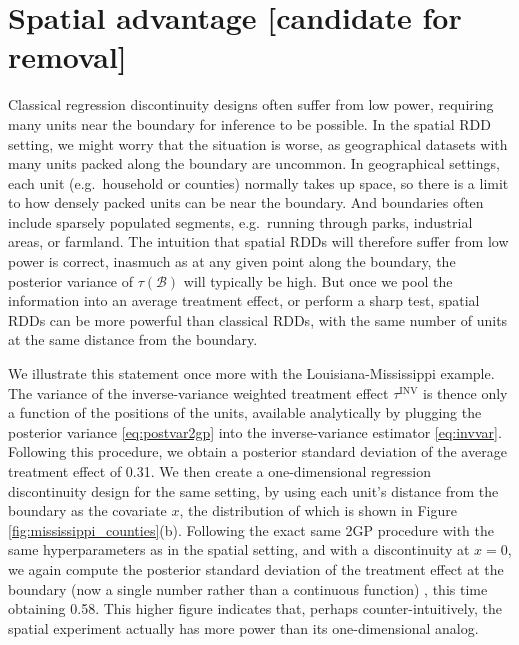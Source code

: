 \documentclass[letter]{article}
\newcommand{\boundary}{\mathcal{B}}
\newcommand{\invvar}{\tau^{\mathrm{INV}}}
\begin{document}
    	\section{Spatial advantage {[}candidate for removal{]}}\label{spatial-advantage-candidate-for-removal}

Classical regression discontinuity designs often suffer from low power, requiring many units near the boundary for inference to be possible.
In the spatial RDD setting, we might worry that the situation is worse, as geographical datasets with many units packed along the boundary are uncommon.
In geographical settings, each unit (e.g.~household or counties) normally takes up space, so there is a limit to how densely packed units can be near the boundary.
And boundaries often include sparsely populated segments, e.g.~running through parks, industrial areas, or farmland.
The intuition that spatial RDDs will therefore suffer from low power is correct, inasmuch as at any given point along the boundary, the posterior variance of \(\tau(\boundary)\) will typically be high.
But once we pool the information into an average treatment effect, or perform a sharp test, spatial RDDs can be more powerful than classical RDDs, with the same number of units at the same distance from the boundary.

We illustrate this statement once more with the Louisiana-Mississippi example.
The variance of the inverse-variance weighted treatment effect \(\invvar\) is thence only a function of the positions of the units, available analytically by plugging the posterior variance \eqref{eq:postvar2gp} into the inverse-variance estimator \eqref{eq:invvar}.
Following this procedure, we obtain a posterior standard deviation of the average treatment effect of 0.31.
We then create a one-dimensional regression discontinuity design for the same setting, by using each unit's distance from the boundary as the covariate \(x\), the distribution of which is shown in Figure \ref{fig:mississippi_counties}(b).
Following the exact same 2GP procedure with the same hyperparameters as in the spatial setting, and with a discontinuity at \(x=0\), we again compute the posterior standard deviation of the treatment effect at the boundary (now a single number rather than a continuous function) , this time obtaining 0.58.
This higher figure indicates that, perhaps counter-intuitively, the spatial experiment actually has more power than its one-dimensional analog.
\end{document}
